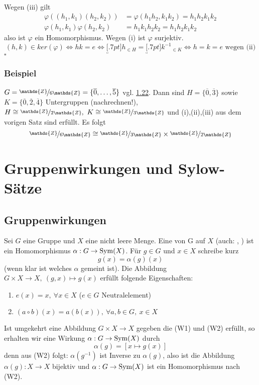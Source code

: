 \\
Wegen (iii) gilt
\begin{equation*}
\begin{aligned}
	\varphi((h_1,k_1)(h_2,k_2)) &= \varphi(h_1h_2,k_1k_2)=h_1h_2k_1k_2\\
	\varphi(h_1,k_1)\varphi(h_2,k_2) &= h_1k_1h_2k_2=h_1h_2k_1k_2
\end{aligned}
\end{equation*}
also ist $\varphi$ ein Homomorphismus. 
Wegen (i) ist $\varphi$ surjektiv.
\[
(h,k)\in ker(\varphi) \Leftrightarrow hk=e \Leftrightarrow \underbracket[.7pt]{h}_{\in H}=\underbracket[.7pt]{k^{-1}}_{\in K} \Leftrightarrow h=k=e \text{ wegen (ii)}
\]
\hfill $\square$

\subsubsection*{Beispiel}
$G=\nicefrac{\mathds{Z}}{6\mathds{Z}}=\{\overline{0},\dots,\overline{5}\}$ vgl. \hyperref[sub:satz_eigenschaften]{1.22}.
Dann sind $H=\{\overline{0},\overline{3}\}$ sowie $K=\{\overline{0},\overline{2},\overline{4}\}$ Untergruppen (nachrechnen!), $H\cong \nicefrac{\mathds{Z}}{2\mathds{Z}},~K\cong \nicefrac{\mathds{Z}}{3\mathds{Z}}$ und (i),(ii),(iii) aus dem vorigen Satz sind erfüllt. 
Es folgt
\[
\nicefrac{\mathds{Z}}{6\mathds{Z}}\cong \nicefrac{\mathds{Z}}{3\mathds{Z}}\times \nicefrac{\mathds{Z}}{2\mathds{Z}} 
\]

\newpage

\section{Gruppenwirkungen und Sylow-Sätze}
\label{sec:gruppen_sylow}

\subsection{Gruppenwirkungen}
\label{sub:gruppenwirkungen}
Sei $G$ eine Gruppe und $X$ eine nicht leere Menge. 
Eine  von G auf $X$ (auch: , ) ist ein Homomorphismus $\alpha:G\to \operatorname{Sym}(X)$. 
Für $g\in G$ und $x\in X$ schreibe kurz 
\[
g(x)=\alpha(g)(x) 
\] 
(wenn klar ist welches $\alpha$ gemeint ist). 
Die Abbildung $G\times X\to X,~ (g,x)\mapsto g(x)$ erfüllt folgende Eigenschaften:
\begin{enumerate}[(W1)]
	\item $e(x)=x,~\forall x\in X$ ($e\in G$ Neutralelement)
	\item $(a\circ b)(x)=a(b(x)),~\forall a,b\in G,~x\in X$
\end{enumerate}
Ist umgekehrt eine Abbildung $G\times X\to X$ gegeben die (W1) und (W2) erfüllt, so erhalten wir eine Wirkung $\alpha: G\to \operatorname{Sym}(X)$ durch
\[
\alpha(g)=[x\mapsto g(x)] 
\]
denn aus (W2) folgt: 
$\alpha(g^{-1})$ ist Inverse zu $\alpha(g)$, also ist die Abbildung $\alpha(g):X\to X$ bijektiv und $\alpha:G\to \operatorname{Sym}(X)$ ist ein Homomorphismus nach (W2).

